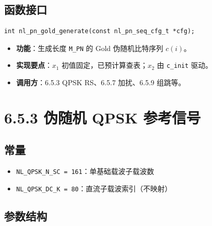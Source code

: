 \documentclass[11pt,a4paper]{ctexart}
\begin{document}
\subsection{函数接口}

\begin{lstlisting}
int nl_pn_gold_generate(const nl_pn_seq_cfg_t *cfg);
\end{lstlisting}

\begin{itemize}[nosep]
  \item \textbf{功能}：生成长度 \texttt{M\_PN} 的 Gold 伪随机比特序列 $c(i)$。
  \item \textbf{实现要点}：$x_1$ 初值固定，已预计算查表；$x_2$ 由 \texttt{c\_init} 驱动。
  \item \textbf{调用方}：6.5.3 QPSK RS、6.5.7 加扰、6.5.9 组跳等。
\end{itemize}

\newpage
\section{6.5.3 伪随机 QPSK 参考信号}

\subsection{常量}

\begin{itemize}[nosep]
  \item \texttt{NL\_QPSK\_N\_SC = 161}：单基础载波子载波数
  \item \texttt{NL\_QPSK\_DC\_K = 80}：直流子载波索引（不映射）
\end{itemize}

\subsection{参数结构}
\end{document}
